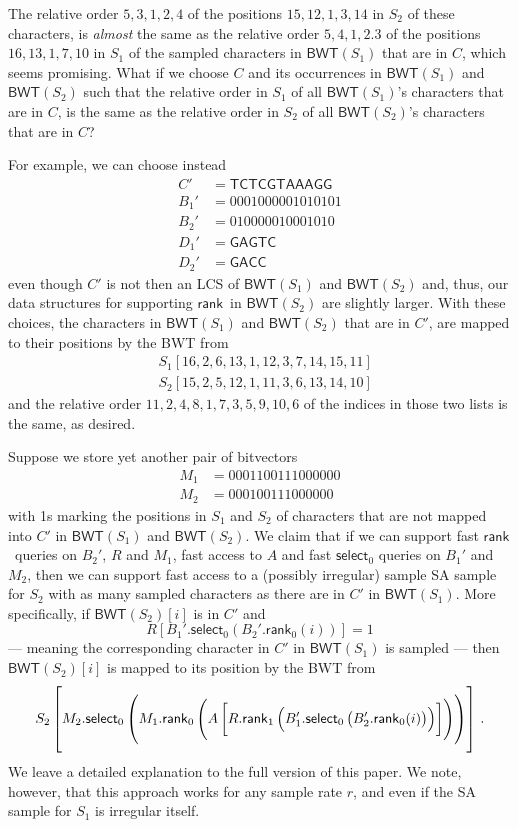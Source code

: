 \documentclass{llncs}
\newcommand{\BWT}
  {\ensuremath{\mathsf{BWT}}}
\newcommand{\rank}
  {\ensuremath{\mathsf{rank}}}
\newcommand{\select}
  {\ensuremath{\mathsf{select}}}
\begin{document}
The relative order \(5, 3, 1, 2, 4\) of the positions \(15, 12, 1, 3, 14\) in $S_2$ of these characters, is {\em almost} the same as the relative order \(5, 4, 1, 2. 3\) of the positions \(16, 13, 1, 7, 10\) in $S_1$ of the sampled characters in \(\BWT (S_1)\) that are in $C$, which seems promising.  What if we choose $C$ and its occurrences in \(\BWT (S_1)\) and \(\BWT (S_2)\) such that the relative order in $S_1$ of all \(\BWT (S_1)\)'s characters that are in $C$, is the same as the relative order in $S_2$ of all \(\BWT (S_2)\)'s characters that are in $C$?

For example, we can choose instead
\begin{align*}
C' & = \mathsf{TCTCGTAAAGG}\\
B_1' & = 0001000001010101\\
B_2' & = 010000010001010\\
D_1' & = \mathsf{GAGTC}\\
D_2' & = \mathsf{GACC}
\end{align*}
even though $C'$ is not then an LCS of \(\BWT (S_1)\) and \(\BWT (S_2)\) and, thus, our data structures for supporting \rank\ in \(\BWT (S_2)\) are slightly larger.  With these choices, the characters in \(\BWT (S_1)\) and \(\BWT (S_2)\) that are in $C'$, are mapped to their positions by the BWT from
\begin{align*}
& S_1 [16, 2, 6, 13, 1, 12, 3, 7, 14, 15, 11]\\
& S_2 [15, 2, 5, 12, 1, 11, 3, 6, 13, 14, 10]
\end{align*}
and the relative order \(11, 2, 4, 8, 1, 7, 3, 5, 9, 10, 6\) of the indices in those two lists is the same, as desired.

Suppose we store yet another pair of bitvectors
\begin{align*}
M_1 & = 0001100111000000\\
M_2 & = 000100111000000
\end{align*}
with 1s marking the positions in $S_1$ and $S_2$ of characters that are not mapped into $C'$ in \(\BWT (S_1)\) and \(\BWT (S_2)\).  We claim that if we can support fast \rank\ queries on $B_2'$, $R$ and $M_1$, fast access to $A$ and fast $\select_0$ queries on $B_1'$ and $M_2$, then we can support fast access to a (possibly irregular) sample SA sample for $S_2$ with as many sampled characters as there are in $C'$ in \(\BWT (S_1)\).  More specifically, if \(\BWT (S_2) [i]\) is in $C'$ and
\[R [B_1'.\select_0 (B_2'.\rank_0 (i))] = 1\]
--- meaning the corresponding character in $C'$ in \(\BWT (S_1)\) is sampled --- then \(\BWT (S_2) [i]\) is mapped to its position by the BWT from
\[S_2 \left[ \rule{0ex}{6ex}
    M_2.\select_0 \left( \rule{0ex}{4.5ex}
      M_1.\rank_0 \left( \rule{0ex}{4ex}
        A \left[ \rule{0ex}{3ex}
          R.\rank_1 \left( \rule{0ex}{2.5ex}
            B_1'.\select_0 \left( \rule{0ex}{2ex}
              B_2'.\rank_0 (i)
            \right)
          \right)
        \right]
      \right)
    \right)
  \right]\,.\]
We leave a detailed explanation to the full version of this paper.  We note, however, that this approach works for any sample rate $r$, and even if the SA sample for $S_1$ is irregular itself.
\end{document}
